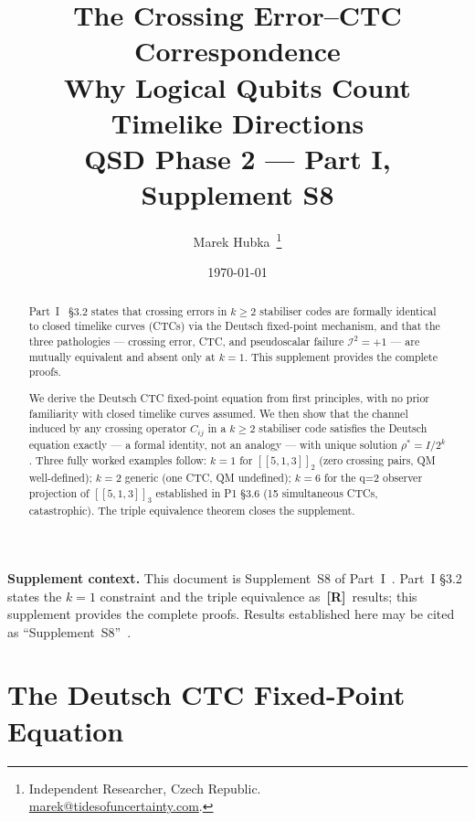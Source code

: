 \documentclass[11pt,a4paper]{article}
\title{
  \textbf{The Crossing Error--CTC Correspondence}\\[0.5em]
  \Large Why Logical Qubits Count Timelike Directions\\[0.8em]
  \large QSD Phase 2 --- Part I, Supplement S8
}
\author{Marek Hubka\, \orcidlink{0009-0003-2476-9017}
  \thanks{Independent Researcher, Czech Republic.\; \\
    \href{mailto:marek@tidesofuncertainty.com}{marek@tidesofuncertainty.com}.}}
\date{\today}
\newcommand{\Rmark}{\textcolor{green!50!black}{\textbf{[R]}}}
\newcommand{\Cq}[4]{[\![#1,#2,#3]\!]_{#4}}
\begin{document}
\maketitle

\begin{abstract}
\noindent
Part~I~\cite{Hubka2026QSD} \S3.2 states that crossing errors in $k\geq2$ stabiliser codes are formally identical to closed timelike curves (CTCs) via the Deutsch fixed-point mechanism, and that the three pathologies --- crossing error, CTC, and pseudoscalar failure $\mathcal{I}^2=+1$ --- are mutually equivalent and absent only at $k=1$. This supplement provides the complete proofs.

We derive the Deutsch CTC fixed-point equation from first principles, with no prior familiarity with closed timelike curves assumed. We then show that the channel induced by any crossing operator $C_{ij}$ in a $k\geq2$ stabiliser code satisfies the Deutsch equation exactly --- a formal identity, not an analogy --- with unique solution $\rho^*=I/2^k$. Three fully worked examples follow: $k=1$ for $\Cq{5}{1}{3}{2}$ (zero crossing pairs, QM well-defined); $k=2$ generic (one CTC, QM undefined); $k=6$ for the q=2 observer projection of $\Cq{5}{1}{3}{3}$ established in P1 \S3.6 (15 simultaneous CTCs, catastrophic). The triple equivalence theorem closes the supplement.
\end{abstract}

\begin{mdframed}[backgroundcolor=insightbg,linecolor=insightcol,
  linewidth=1.5pt, skipabove=8pt, skipbelow=8pt]
\textbf{Supplement context.}\quad
This document is Supplement~S8 of Part~I~\cite{Hubka2026QSD}. Part~I \S3.2 states the $k=1$ constraint and the triple equivalence as~\Rmark\ results; this supplement provides the complete proofs. Results established here may be cited as ``Supplement~S8''~\cite{Hubka2026QSDSupp}.
\end{mdframed}

\newpage
\tableofcontents
\newpage

\section{The Deutsch CTC Fixed-Point Equation}
\label{sec:deutsch}
\end{document}
